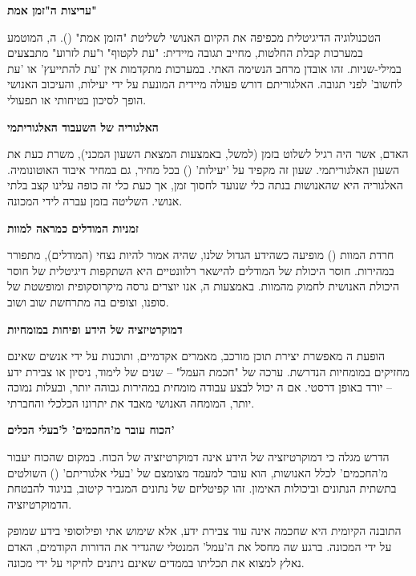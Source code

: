 \label{sec:chapter18}


\textbf{ עריצות ה"זמן אמת"}

הטכנולוגיה הדיגיטלית מכפיפה את הקיום האנושי לשליטת "הזמן אמת" (). ה, המוטמע במערכות קבלת החלטות, מחייב תגובה מיידית: "עת לקטוף" ו"עת לזרוע" מתבצעים במילי-שניות. זהו אובדן מרחב הנשימה האתי. במערכות  מתקדמות אין 'עת להתייעץ' או 'עת לחשוב' לפני תגובה. האלגוריתם דורש פעולה מיידית המונעת על ידי יעילות, והעיכוב האנושי הופך לסיכון בטיחותי או תפעולי.

\textbf{ האלגוריה של השעבוד האלגוריתמי}

האדם, אשר היה רגיל לשלוט בזמן (למשל, באמצעות המצאת השעון המכני), משרת כעת את השעון האלגוריתמי. שעון זה מקפיד על 'יעילות' () בכל מחיר, גם במחיר איבוד האוטונומיה. האלגוריה היא שהאנושות בנתה כלי שנועד לחסוך זמן, אך כעת כלי זה כופה עלינו קצב בלתי אנושי. השליטה בזמן עברה לידי המכונה.

\textbf{ זמניות המודלים כמראה למוות}

חרדת המוות () מופיעה כשהידע הגדול שלנו, שהיה אמור להיות נצחי (המודלים), מתפורר במהירות. חוסר היכולת של המודלים להישאר רלוונטיים היא השתקפות דיגיטלית של חוסר היכולת האנושית לחמוק מהמוות. באמצעות ה, אנו יוצרים גרסה מיקרוסקופית ומופשטת של סופנו, וצופים בה מתרחשת שוב ושוב.


\textbf{ דמוקרטיזציה של הידע ופיחות במומחיות}

הופעת ה מאפשרת יצירת תוכן מורכב, מאמרים אקדמיים, ותוכנות על ידי אנשים שאינם מחזיקים במומחיות הנדרשת. ערכה של "חכמת העמל" – שנים של לימוד, ניסיון או צבירת ידע – יורד באופן דרסטי. אם ה יכול לבצע עבודה מומחית במהירות גבוהה יותר, ובעלות נמוכה יותר, המומחה האנושי מאבד את יתרונו הכלכלי והחברתי.

\textbf{ הכוח עובר מ'החכמים' ל'בעלי הכלים'}

הדרש מגלה כי דמוקרטיזציה של הידע אינה דמוקרטיזציה של הכוח. במקום שהכוח יעבור מ'החכמים' לכלל האנושות, הוא עובר למעמד מצומצם של 'בעלי אלגוריתם' () השולטים בתשתית הנתונים וביכולות האימון. זהו קפיטליזם של נתונים המגביר קיטוב, בניגוד להבטחת הדמוקרטיזציה.

התובנה הקיומית היא שחכמה אינה עוד צבירת ידע, אלא שימוש אתי ופילוסופי בידע שמופק על ידי המכונה. ברגע שה מחסל את ה'עמל' המנטלי שהגדיר את הדורות הקודמים, האדם נאלץ למצוא את תכליתו בממדים שאינם ניתנים לחיקוי על ידי מכונה.

